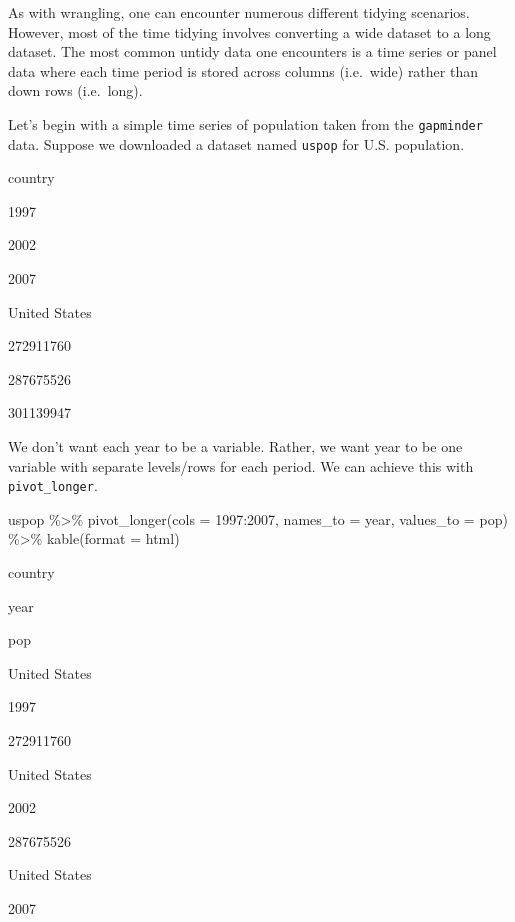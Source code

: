 \documentclass[
]{book}
\makeatletter
\newenvironment{Shaded}{\begin{snugshade}}{\end{snugshade}}
\newcommand{\AttributeTok}[1]{\textcolor[rgb]{0.61,0.61,0.61}{#1}}
\newcommand{\FunctionTok}[1]{\textcolor[rgb]{0,0,0}{#1}}
\newcommand{\NormalTok}[1]{#1}
\newcommand{\SpecialCharTok}[1]{\textcolor[rgb]{0,0,0}{#1}}
\newcommand{\StringTok}[1]{\textcolor[rgb]{0.5,0.5,0.5}{#1}}
\newenvironment{kframe}{%
\medskip{}
\setlength{\fboxsep}{.8em}
 \def\at@end@of@kframe{}%
 \ifinner\ifhmode%
  \def\at@end@of@kframe{\end{minipage}}%
  \begin{minipage}{\columnwidth}%
 \fi\fi%
 \def\FrameCommand##1{\hskip\@totalleftmargin \hskip-\fboxsep
 \colorbox{shadecolor}{##1}\hskip-\fboxsep
     \hskip-\linewidth \hskip-\@totalleftmargin \hskip\columnwidth}%
 \MakeFramed {\advance\hsize-\width
   \@totalleftmargin\z@ \linewidth\hsize
   \@setminipage}}%
 {\par\unskip\endMakeFramed%
 \at@end@of@kframe}
\renewenvironment{Shaded}{\begin{kframe}}{\end{kframe}}
\makeatother
\begin{document}
As with wrangling, one can encounter numerous different tidying scenarios. However, most of the time tidying involves converting a wide dataset to a long dataset. The most common untidy data one encounters is a time series or panel data where each time period is stored across columns (i.e.~wide) rather than down rows (i.e.~long).

Let's begin with a simple time series of population taken from the \texttt{gapminder} data. Suppose we downloaded a dataset named \texttt{uspop} for U.S. population.

country

1997

2002

2007

United States

272911760

287675526

301139947

We don't want each year to be a variable. Rather, we want year to be one variable with separate levels/rows for each period. We can achieve this with \texttt{pivot\_longer}.

\begin{Shaded}
\begin{Highlighting}[]
\NormalTok{uspop }\SpecialCharTok{\%\textgreater{}\%} 
  \FunctionTok{pivot\_longer}\NormalTok{(}\AttributeTok{cols =} \StringTok{\textquotesingle{}1997\textquotesingle{}}\SpecialCharTok{:}\StringTok{\textquotesingle{}2007\textquotesingle{}}\NormalTok{, }
               \AttributeTok{names\_to =} \StringTok{\textquotesingle{}year\textquotesingle{}}\NormalTok{,}
               \AttributeTok{values\_to =} \StringTok{\textquotesingle{}pop\textquotesingle{}}\NormalTok{) }\SpecialCharTok{\%\textgreater{}\%} 
  \FunctionTok{kable}\NormalTok{(}\AttributeTok{format =} \StringTok{\textquotesingle{}html\textquotesingle{}}\NormalTok{)}
\end{Highlighting}
\end{Shaded}

country

year

pop

United States

1997

272911760

United States

2002

287675526

United States

2007
\end{document}
